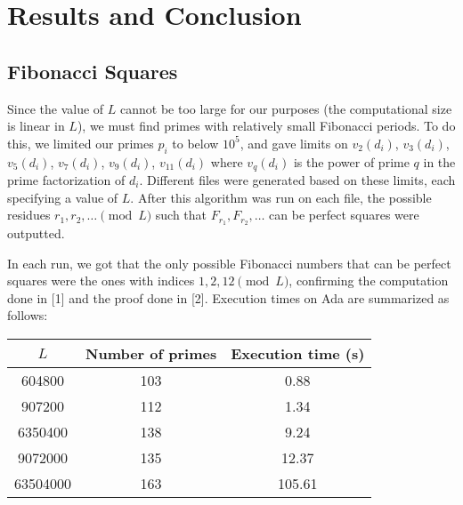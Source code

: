 \documentclass[11pt]{article}
\begin{document}
\section{Results and Conclusion}
\subsection{Fibonacci Squares}
Since the value of $L$ cannot be too large for our purposes (the computational size is linear in $L$), we must find primes with relatively small Fibonacci periods. To do this, we limited our primes $p_i$ to below $10^5$, and gave limits on $v_2(d_i)$, $v_3(d_i)$, $v_5(d_i)$, $v_7(d_i)$, $v_9(d_i)$, $v_{11}(d_i)$ where $v_q(d_i)$ is the power of prime $q$ in the prime factorization of $d_i$. Different files were generated based on these limits, each specifying a value of $L$. After this algorithm was run on each file, the possible residues $r_1, r_2, \dots \pmod L$ such that $F_{r_1}, F_{r_2}, \dots$ can be perfect squares were outputted.

In each run, we got that the only possible Fibonacci numbers that can be perfect squares were the ones with indices $1, 2, 12 \pmod{L}$, confirming the computation done in [1] and the proof done in [2]. Execution times on Ada are summarized as follows:

\begin{tabular}{ccc}
\hline
$L$ & Number of primes & Execution time (s) \\ \hline
604800 & 103 & 0.88 \\
907200 & 112 & 1.34 \\
6350400 & 138 & 9.24 \\
9072000 & 135 & 12.37 \\
63504000 & 163 & 105.61 \\ \hline \hline
\end{tabular}
\end{document}
